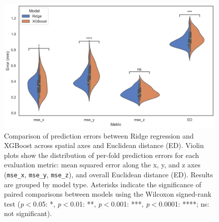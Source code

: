 \begin{figure}[hbt!]
    \centering
    \includegraphics[width=0.95\linewidth]{figs/figuresupridgevsxgboost.png}
    \caption{Comparison of prediction errors between Ridge regression and XGBoost across spatial axes and Euclidean distance (ED). Violin plots show the distribution of per-fold prediction errors for each evaluation metric: mean squared error along the x, y, and z axes (\texttt{mse\_x}, \texttt{mse\_y}, \texttt{mse\_z}), and overall Euclidean distance (ED). Results are grouped by model type. Asterisks indicate the significance of paired comparisons between models using the Wilcoxon signed-rank test (\textit{p}\(<\)0.05: *, \textit{p}\(<\)0.01: **, \textit{p}\(<\)0.001: ***, \textit{p}\(<\)0.0001: ****; ns: not significant).}
    \label{fig:figuresupridgevsxgboost}
\end{figure}